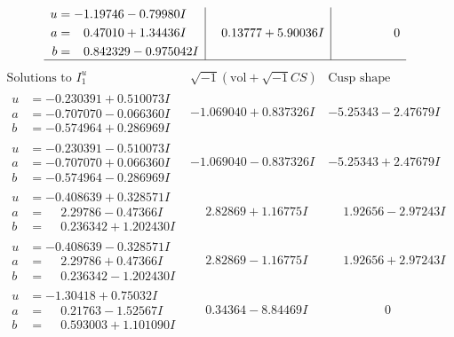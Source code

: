 \documentclass[1p]{elsarticle_modified}
\theoremstyle{definition}
\newcommand{\I}{\sqrt{-1}}
\begin{document}
$$\begin{array}{c|c|c}
\begin{aligned}
u &= -1.19746 - 0.79980 I \\
a &= \phantom{-}0.47010 + 1.34436 I \\
b &= \phantom{-}0.842329 - 0.975042 I\end{aligned}
 & \phantom{-}0.13777 + 5.90036 I & \phantom{-0.000000 } 0\\
 \hline 
 \end{array}$$\newpage$$\begin{array}{c|c|c}  
\text{Solutions to }I^u_{1}& \I (\text{vol} + \sqrt{-1}CS) & \text{Cusp shape}\\
 \hline 
\begin{aligned}
u &= -0.230391 + 0.510073 I \\
a &= -0.707070 - 0.066360 I \\
b &= -0.574964 + 0.286969 I\end{aligned}
 & -1.069040 + 0.837326 I & -5.25343 - 2.47679 I \\ \hline\begin{aligned}
u &= -0.230391 - 0.510073 I \\
a &= -0.707070 + 0.066360 I \\
b &= -0.574964 - 0.286969 I\end{aligned}
 & -1.069040 - 0.837326 I & -5.25343 + 2.47679 I \\ \hline\begin{aligned}
u &= -0.408639 + 0.328571 I \\
a &= \phantom{-}2.29786 - 0.47366 I \\
b &= \phantom{-}0.236342 + 1.202430 I\end{aligned}
 & \phantom{-}2.82869 + 1.16775 I & \phantom{-}1.92656 - 2.97243 I \\ \hline\begin{aligned}
u &= -0.408639 - 0.328571 I \\
a &= \phantom{-}2.29786 + 0.47366 I \\
b &= \phantom{-}0.236342 - 1.202430 I\end{aligned}
 & \phantom{-}2.82869 - 1.16775 I & \phantom{-}1.92656 + 2.97243 I \\ \hline\begin{aligned}
u &= -1.30418 + 0.75032 I \\
a &= \phantom{-}0.21763 - 1.52567 I \\
b &= \phantom{-}0.593003 + 1.101090 I\end{aligned}
 & \phantom{-}0.34364 - 8.84469 I & \phantom{-0.000000 } 0 \\ \hline\begin{aligned}

\end{aligned}
\end{array}$$
\end{document}
